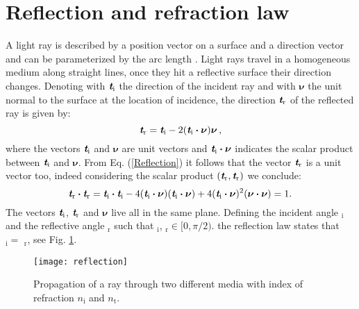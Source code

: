 \section{Reflection and refraction law}\label{sec:reflection}
A light ray is described by a position vector  on a surface and a direction vector  and can be parameterized by the arc length .
Light rays travel in a homogeneous medium along straight lines, once they hit a reflective surface their direction changes.
 Denoting with $\textit{\textbf{t}}_\textrm{i}$ the direction of the incident ray and with $\boldsymbol{\nu}$ the unit normal to the surface at the location of incidence, the direction $\textit{\textbf{t}}_\textrm{r}$ of the reflected ray is given by:
 \begin{equation}\label{Reflection}
  \textit{\textbf{t}}_\textrm{r} = \textit{\textbf{t}}_\textrm{i}-2 (\textit{\textbf{t}}_\textrm{i}\boldsymbol{\cdot}\boldsymbol{\nu})\boldsymbol{\nu}\,,
\end{equation}
where the vectors $\textit{\textbf{t}}_\textrm{i}$ and $\boldsymbol{\nu}$ are unit vectors and $\textit{\textbf{t}}_\textrm{i}\boldsymbol{\cdot}\boldsymbol{\nu}$ indicates the scalar product between 
$\textit{\textbf{t}}_\textrm{i}$ and $\boldsymbol{\nu}$. 
From Eq. (\ref{Reflection}) it follows that the vector  $\textit{\textbf{t}}_\textrm{r}$ is a unit vector too, indeed considering the scalar product $(\textit{\textbf{t}}_\textrm{r},\textit{\textbf{t}}_\textrm{r})$ we conclude:
\begin{equation}\label{unit_vector}
\textit{\textbf{t}}_\textrm{r}\boldsymbol{\cdot}\textit{\textbf{t}}_\textrm{r} = \textit{\textbf{t}}_\textrm{i}\boldsymbol{\cdot}\textit{\textbf{t}}_\textrm{i} 
- 4(\textit{\textbf{t}}_\textrm{i}\boldsymbol{\cdot}\boldsymbol{\nu})(\textit{\textbf{t}}_\textrm{i}\boldsymbol{\cdot}\boldsymbol{\nu})+
4(\textit{\textbf{t}}_\textrm{i}\boldsymbol{\cdot}\boldsymbol{\nu})^2(\boldsymbol{\nu}\boldsymbol{\cdot}\boldsymbol{\nu})=1 .
\end{equation} 
The vectors $\textit{\textbf{t}}_\textrm{i}$, $\textit{\textbf{t}}_\textrm{r}$ and $\boldsymbol{\nu}$ live all in the same plane.
Defining the incident angle \myangle$_\textrm{i}$ and the reflective angle \myangle$_\textrm{r}$ such that \myangle$_\textrm{i}$, \myangle$_\textrm{r} \in[0, \pi/2)$.
the reflection law states that \myangle$_\textrm{i}=$ \myangle$_\textrm{r}$, see Fig. \ref{fig:Snell}.
\begin{figure}[h]
 \label{fig:Snell}
     \begin{center}
     \texttt{[image: reflection]}
     \end{center}
     \caption{Propagation of a ray through two different media with index of refraction $n_\textrm{i}$ and $n_\textrm{t}$.}%
\label{fig:Snell}
 \end{figure}
